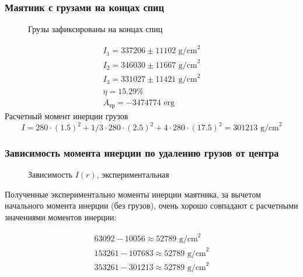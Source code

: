 \documentclass[a4paper,12pt]{article}
\begin{document}
\subsubsection{Маятник с грузами на концах спиц}
\begin{figure}[H]
	\centering
	
	\caption{Грузы зафиксированы на концах спиц}
	\label{fig:cargo-none}
\end{figure}
\begin{gather}
	I_1=337206\pm 11102 \text{ g/cm}^2\\
	I_2=346030\pm 11667 \text{ g/cm}^2\\
	I_3=331027\pm 11421 \text{ g/cm}^2\\
	\eta= 15.29 \%\\
	A_\text{тр}= -3474774 \text{ erg}
\end{gather}
Расчетный момент инерции грузов
\begin{equation}
	I=280\cdot(1.5)^2+1/3\cdot280\cdot(2.5)^2+4\cdot280\cdot(17.5)^2=301213\text{ g/cm}^2
\end{equation}

\subsubsection{Зависимость момента инерции по удалению грузов от центра}
\begin{figure}[H]
	\centering
	
	\caption{Зависимость $I(r)$, экспериментальная}
	\label{fig:cargo-none}
\end{figure}

Полученные экспериментально моменты инерции маятника, за вычетом начального момента инерции (без грузов), очень хорошо совпадают с расчетными значениями моментов инерции:

\begin{gather}
	63092 - 10056\approx 52789 \text{ g/cm}^2\\
	153261 - 107683\approx 52789 \text{ g/cm}^2\\
	353261 - 301213\approx 52789 \text{ g/cm}^2
\end{gather}


\end{document}
